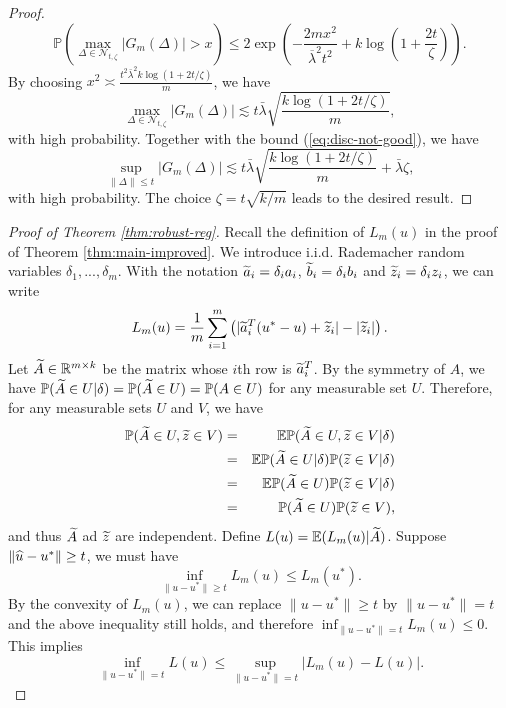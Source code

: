 \begin{proof}
\begin{equation}
\mathbb{P}\left(\max_{\Delta\in\mathcal{N}_{t,\zeta}}\left|G_m(\Delta)\right| > x\right) \leq 2\exp\left(-\frac{2mx^2}{\overline{\lambda}^2t^2}+k\log\left(1+\frac{2t}{\zeta}\right)\right).\label{eq:double-ub}
\end{equation}
By choosing $x^2\asymp \frac{t^2\bar{\lambda}^2k\log(1+2t/\zeta)}{m}$, we have
$$\max_{\Delta\in\mathcal{N}_{t,\zeta}}\left|G_m(\Delta)\right| \lesssim t\bar{\lambda}\sqrt{\frac{k\log(1+2t/\zeta)}{m}},$$
with high probability. Together with the bound (\ref{eq:disc-not-good}), we have
$$\sup_{\|\Delta\|\leq t}|G_m(\Delta)| \lesssim t\bar{\lambda}\sqrt{\frac{k\log(1+2t/\zeta)}{m}} + \bar{\lambda}\zeta,$$
with high probability.
The choice $\zeta=t\sqrt{k/m}$ leads to the desired result.
\end{proof}

\begin{proof}[Proof of Theorem \ref{thm:robust-reg}]
Recall the definition of $L_m(u)$ in the proof of Theorem \ref{thm:main-improved}.
We introduce i.i.d. Rademacher random variables $\delta_1,...,\delta_m$. With the notation $\widetilde{a}_i=\delta_ia_i$, $\widetilde{b}_i=\delta_ib_i$ and $\widetilde{z}_i=\delta_iz_i$, we can write
$$
L_m(u) = \frac{1}{m}\sum_{i=1}^m\left(|\widetilde{a}_i^T(u^*-u)+\widetilde{z}_i|-|\widetilde{z}_i|\right).
$$
Let $\widetilde{A}\in\mathbb{R}^{m\times k}$ be the matrix whose $i$th row is $\widetilde{a}_i^T$. By the symmetry of $A$, we have $\mathbb{P}(\widetilde{A}\in U|\delta)=\mathbb{P}(\widetilde{A}\in U)=\mathbb{P}(A\in U)$ for any measurable set $U$. Therefore, for any measurable sets $U$ and $V$, we have
\begin{eqnarray*}
\mathbb{P}(\wt{A}\in U, \wt{z}\in V) &=& \mathbb{E}\mathbb{P}(\wt{A}\in U, \wt{z}\in V|\delta) \\
&=& \mathbb{E}\mathbb{P}(\wt{A}\in U|\delta)\mathbb{P}(\wt{z}\in V|\delta) \\
&=& \mathbb{E}\mathbb{P}(\wt{A}\in U)\mathbb{P}(\wt{z}\in V|\delta) \\
&=& \mathbb{P}(\wt{A}\in U)\mathbb{P}(\wt{z}\in V),
\end{eqnarray*}
and thus $\widetilde{A}$ ad $\widetilde{z}$ are independent. Define $L(u)=\mathbb{E}(L_m(u)|\widetilde{A})$. Suppose $\|\widehat{u}-u^*\|\geq t$, we must have
$$\inf_{\|u-u^*\|\geq t}L_m(u) \leq L_m(u^*).$$
By the convexity of $L_m(u)$, we can replace $\|u-u^*\|\geq t$ by $\|u-u^*\| = t$ and the above inequality still holds, and therefore $\inf_{\|u-u^*\|= t}L_m(u)\leq 0$. This implies
\begin{equation}
\inf_{\|u-u^*\|=t}L(u) \leq \sup_{\|u-u^*\|= t}|L_m(u)-L(u)|. \label{eq:basic-L}

\end{equation}
\end{proof}
